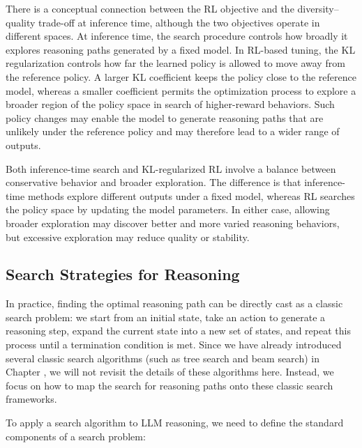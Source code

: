 There is a conceptual connection between the RL objective and the diversity--quality trade-off at inference time, although the two objectives operate in different spaces. At inference time, the search procedure controls how broadly it explores reasoning paths generated by a fixed model. In RL-based tuning, the KL regularization controls how far the learned policy is allowed to move away from the reference policy. A larger KL coefficient keeps the policy close to the reference model, whereas a smaller coefficient permits the optimization process to explore a broader region of the policy space in search of higher-reward behaviors. Such policy changes may enable the model to generate reasoning paths that are unlikely under the reference policy and may therefore lead to a wider range of outputs.

Both inference-time search and KL-regularized RL involve a balance between conservative behavior and broader exploration. The difference is that inference-time methods explore different outputs under a fixed model, whereas RL searches the policy space by updating the model parameters. In either case, allowing broader exploration may discover better and more varied reasoning behaviors, but excessive exploration may reduce quality or stability.

\subsection{Search Strategies for Reasoning}
\label{sec:search-strategies-for-reasoning}

In practice, finding the optimal reasoning path can be directly cast as a classic search problem: we start from an initial state, take an action to generate a reasoning step, expand the current state into a new set of states, and repeat this process until a termination condition is met. Since we have already introduced several classic search algorithms (such as tree search and beam search) in Chapter \ChapterLLMInference, we will not revisit the details of these algorithms here. Instead, we focus on how to map the search for reasoning paths onto these classic search frameworks.

To apply a search algorithm to LLM reasoning, we need to define the standard components of a search problem:

